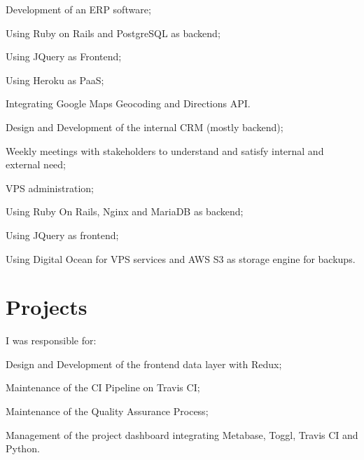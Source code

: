 \documentclass[]{deedy-resume-openfont}
\begin{document}
\begin{minipage}[t]{0.65\textwidth}
\begin{tightemize}
\item Development of an ERP software;
\item Using Ruby on Rails and PostgreSQL as backend;
\item Using JQuery as Frontend;
\item Using Heroku as PaaS;
\item Integrating Google Maps Geocoding and Directions API.
\end{tightemize}
\sectionsep
{}
\begin{tightemize}
	\item Design and Development of the internal CRM (mostly backend);
	\item Weekly meetings with stakeholders to understand and satisfy internal and external need;
	\item VPS administration;
	\item Using Ruby On Rails, Nginx and MariaDB as backend;
	\item Using JQuery as frontend;
	\item Using Digital Ocean for VPS services and AWS S3 as storage engine for backups.
\end{tightemize}
\sectionsep
\section{Projects}
\vspace{\topsep} %
I was responsible for:
\begin{tightemize}
	\item Design and Development of the frontend data layer with Redux;
	\item Maintenance of the CI Pipeline on Travis CI;
	\item Maintenance of the Quality Assurance Process;
	\item Management of the project dashboard integrating Metabase, Toggl, Travis CI and Python.
\end{tightemize}
\sectionsep
\begin{comment}

\end{comment}
\end{minipage}
\end{document}

